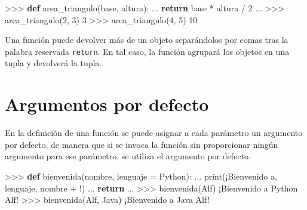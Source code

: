 \documentclass[
  spanish,
  a4paper,
]{scrreport}
\newenvironment{Shaded}{\begin{snugshade}}{\end{snugshade}}
\newcommand{\BuiltInTok}[1]{\textcolor[rgb]{0.00,0.23,0.31}{#1}}
\newcommand{\ControlFlowTok}[1]{\textcolor[rgb]{0.00,0.23,0.31}{\textbf{#1}}}
\newcommand{\DecValTok}[1]{\textcolor[rgb]{0.68,0.00,0.00}{#1}}
\newcommand{\KeywordTok}[1]{\textcolor[rgb]{0.00,0.23,0.31}{\textbf{#1}}}
\newcommand{\NormalTok}[1]{\textcolor[rgb]{0.00,0.23,0.31}{#1}}
\newcommand{\OperatorTok}[1]{\textcolor[rgb]{0.37,0.37,0.37}{#1}}
\newcommand{\StringTok}[1]{\textcolor[rgb]{0.13,0.47,0.30}{#1}}
\begin{document}
\begin{Shaded}
\begin{Highlighting}[]
\OperatorTok{\textgreater{}\textgreater{}\textgreater{}} \KeywordTok{def}\NormalTok{ area\_triangulo(base, altura):}
\NormalTok{...     }\ControlFlowTok{return}\NormalTok{ base }\OperatorTok{*}\NormalTok{ altura }\OperatorTok{/} \DecValTok{2}
\NormalTok{...}
\OperatorTok{\textgreater{}\textgreater{}\textgreater{}}\NormalTok{ area\_triangulo(}\DecValTok{2}\NormalTok{, }\DecValTok{3}\NormalTok{)}
\DecValTok{3}
\OperatorTok{\textgreater{}\textgreater{}\textgreater{}}\NormalTok{ area\_triangulo(}\DecValTok{4}\NormalTok{, }\DecValTok{5}\NormalTok{)}
\DecValTok{10}
\end{Highlighting}
\end{Shaded}

Una función puede devolver más de un objeto separándolos por comas tras
la palabra reservada \texttt{return}. En tal caso, la función agrupará
los objetos en una tupla y devolverá la tupla.

\section{Argumentos por defecto}\label{argumentos-por-defecto}

En la definición de una función se puede asignar a cada parámetro un
argumento por defecto, de manera que si se invoca la función sin
proporcionar ningún argumento para ese parámetro, se utiliza el
argumento por defecto.

\begin{Shaded}
\begin{Highlighting}[]
\OperatorTok{\textgreater{}\textgreater{}\textgreater{}} \KeywordTok{def}\NormalTok{ bienvenida(nombre, lenguaje }\OperatorTok{=} \StringTok{\textquotesingle{}Python\textquotesingle{}}\NormalTok{):}
\NormalTok{...     }\BuiltInTok{print}\NormalTok{(}\StringTok{\textquotesingle{}¡Bienvenido a\textquotesingle{}}\NormalTok{, lenguaje, nombre }\OperatorTok{+} \StringTok{\textquotesingle{}!\textquotesingle{}}\NormalTok{)}
\NormalTok{...     }\ControlFlowTok{return}
\NormalTok{...}
\OperatorTok{\textgreater{}\textgreater{}\textgreater{}}\NormalTok{ bienvenida(}\StringTok{\textquotesingle{}Alf\textquotesingle{}}\NormalTok{)}
\NormalTok{¡Bienvenido a Python Alf}\OperatorTok{!}
\OperatorTok{\textgreater{}\textgreater{}\textgreater{}}\NormalTok{ bienvenida(}\StringTok{\textquotesingle{}Alf\textquotesingle{}}\NormalTok{, }\StringTok{\textquotesingle{}Java\textquotesingle{}}\NormalTok{)}
\NormalTok{¡Bienvenido a Java Alf}\OperatorTok{!}
\end{Highlighting}
\end{Shaded}
\end{document}
